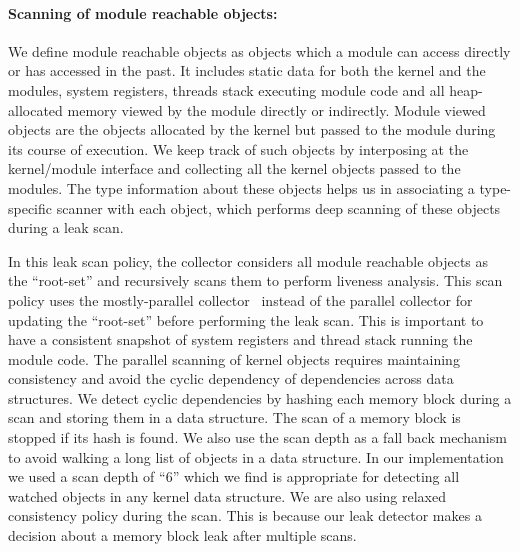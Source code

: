 

\paragraph{Scanning of module reachable objects:} 
We define module reachable objects as objects which a module can access directly or has accessed in the past. It includes static data for both the kernel and the modules, system registers, threads stack executing module code and all heap-allocated memory viewed by the module directly or indirectly. Module viewed objects are the objects allocated by the kernel but passed to the module during its course of execution. We keep track of such objects by interposing at the kernel/module interface and collecting all the kernel objects passed to the modules. The type information about these objects helps us in associating a type-specific scanner with each object, which performs deep scanning of these objects during a leak scan.

In this leak scan policy, the collector considers all module reachable objects as the ``root-set'' and recursively scans them to perform liveness analysis. This scan policy uses the mostly-parallel collector~\cite{Boehm:1991:MPG:113445.113459, Barabash:2005:PIM:1108970.1108972} instead of the parallel collector for updating the ``root-set'' before performing the leak scan. This is important to have a consistent snapshot of system registers and thread stack running the module code.  The parallel scanning of kernel objects requires maintaining consistency and avoid the cyclic dependency of dependencies across data structures. We detect cyclic dependencies by hashing each memory block during a scan and storing them in a data structure. The scan of a memory block is stopped if its hash is found. We also use the scan depth as a fall back mechanism to avoid walking a long list of objects in a data structure. In our implementation we used a scan depth of ``6'' which we find is appropriate for detecting all watched objects in any kernel data structure. We are also using relaxed consistency policy during the scan. This is because our leak detector makes a decision about a memory block leak after multiple scans.

